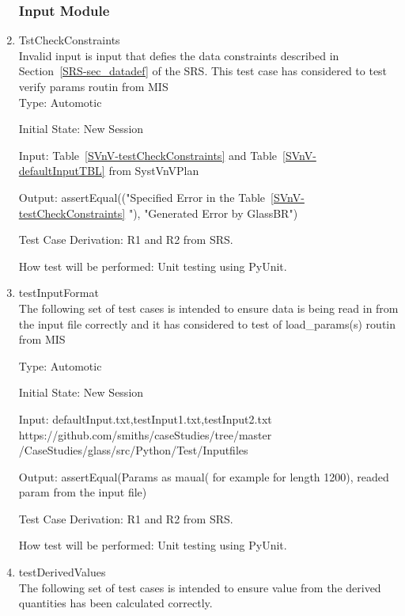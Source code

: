 \documentclass[12pt]{article}
\begin{document}
\begin{enumerate}
	
	\subsubsection{Input Module}
	
	\item{TstCheckConstraints} \\
	Invalid input is input that defies the data constraints described
	in Section~\ref{SRS-sec_datadef} of the SRS. This test case has considered to test verify params routin from MIS \\
	Type: Automotic
	
	Initial State: New Session
	
	Input: Table~\ref{SVnV-testCheckConstraints}  and Table~\ref{SVnV-defaultInputTBL} from SystVnVPlan
	
	
	Output: assertEqual(("Specified Error in the Table~\ref{SVnV-testCheckConstraints} "), "Generated Error by GlassBR")
	
	Test Case Derivation: R1 and R2 from SRS.
	
	How test will be performed: Unit testing using PyUnit.
	
	\item{testInputFormat} \\
	The following set of test cases is intended to ensure data is being read in from the input file correctly and it has considered to test of load\_params(s) routin from MIS
	
	Type: Automotic
	
	Initial State: New Session
	
	Input: defaultInput.txt,testInput1.txt,testInput2.txt \\ https://github.com/smiths/caseStudies/tree/master
	/CaseStudies/glass/src/Python/Test/Inputfiles
	
	
	Output: assertEqual(Params as maual( for example for length 1200), readed param from the input file)
	
	Test Case Derivation: R1 and R2 from SRS.
	
	How test will be performed: Unit testing using PyUnit.
	
	\item{testDerivedValues} \\
	The following set of test cases is intended to ensure value from the derived quantities has been calculated correctly.
	

\end{enumerate}
\end{document}
